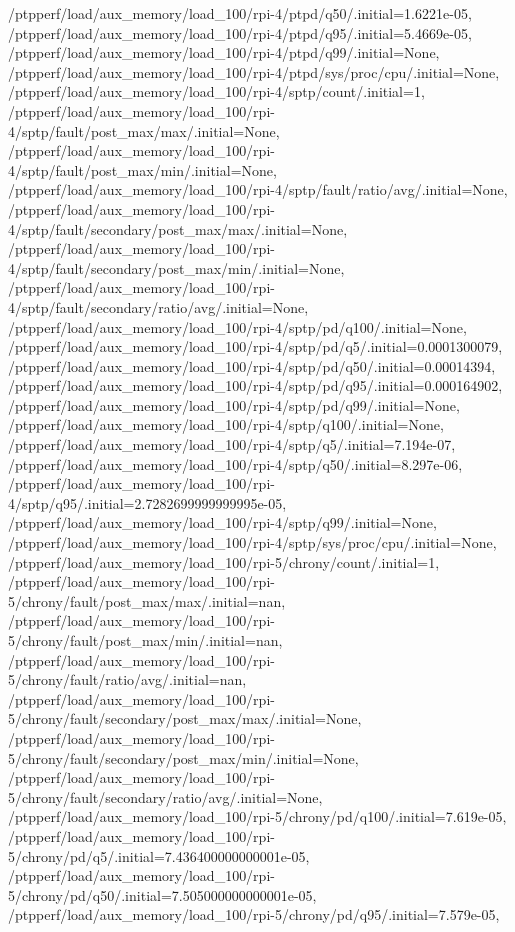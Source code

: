 {    /ptpperf/load/aux_memory/load_100/rpi-4/ptpd/q50/.initial=1.6221e-05,
    /ptpperf/load/aux_memory/load_100/rpi-4/ptpd/q95/.initial=5.4669e-05,
    /ptpperf/load/aux_memory/load_100/rpi-4/ptpd/q99/.initial=None,
    /ptpperf/load/aux_memory/load_100/rpi-4/ptpd/sys/proc/cpu/.initial=None,
    /ptpperf/load/aux_memory/load_100/rpi-4/sptp/count/.initial=1,
    /ptpperf/load/aux_memory/load_100/rpi-4/sptp/fault/post_max/max/.initial=None,
    /ptpperf/load/aux_memory/load_100/rpi-4/sptp/fault/post_max/min/.initial=None,
    /ptpperf/load/aux_memory/load_100/rpi-4/sptp/fault/ratio/avg/.initial=None,
    /ptpperf/load/aux_memory/load_100/rpi-4/sptp/fault/secondary/post_max/max/.initial=None,
    /ptpperf/load/aux_memory/load_100/rpi-4/sptp/fault/secondary/post_max/min/.initial=None,
    /ptpperf/load/aux_memory/load_100/rpi-4/sptp/fault/secondary/ratio/avg/.initial=None,
    /ptpperf/load/aux_memory/load_100/rpi-4/sptp/pd/q100/.initial=None,
    /ptpperf/load/aux_memory/load_100/rpi-4/sptp/pd/q5/.initial=0.0001300079,
    /ptpperf/load/aux_memory/load_100/rpi-4/sptp/pd/q50/.initial=0.00014394,
    /ptpperf/load/aux_memory/load_100/rpi-4/sptp/pd/q95/.initial=0.000164902,
    /ptpperf/load/aux_memory/load_100/rpi-4/sptp/pd/q99/.initial=None,
    /ptpperf/load/aux_memory/load_100/rpi-4/sptp/q100/.initial=None,
    /ptpperf/load/aux_memory/load_100/rpi-4/sptp/q5/.initial=7.194e-07,
    /ptpperf/load/aux_memory/load_100/rpi-4/sptp/q50/.initial=8.297e-06,
    /ptpperf/load/aux_memory/load_100/rpi-4/sptp/q95/.initial=2.7282699999999995e-05,
    /ptpperf/load/aux_memory/load_100/rpi-4/sptp/q99/.initial=None,
    /ptpperf/load/aux_memory/load_100/rpi-4/sptp/sys/proc/cpu/.initial=None,
    /ptpperf/load/aux_memory/load_100/rpi-5/chrony/count/.initial=1,
    /ptpperf/load/aux_memory/load_100/rpi-5/chrony/fault/post_max/max/.initial=nan,
    /ptpperf/load/aux_memory/load_100/rpi-5/chrony/fault/post_max/min/.initial=nan,
    /ptpperf/load/aux_memory/load_100/rpi-5/chrony/fault/ratio/avg/.initial=nan,
    /ptpperf/load/aux_memory/load_100/rpi-5/chrony/fault/secondary/post_max/max/.initial=None,
    /ptpperf/load/aux_memory/load_100/rpi-5/chrony/fault/secondary/post_max/min/.initial=None,
    /ptpperf/load/aux_memory/load_100/rpi-5/chrony/fault/secondary/ratio/avg/.initial=None,
    /ptpperf/load/aux_memory/load_100/rpi-5/chrony/pd/q100/.initial=7.619e-05,
    /ptpperf/load/aux_memory/load_100/rpi-5/chrony/pd/q5/.initial=7.436400000000001e-05,
    /ptpperf/load/aux_memory/load_100/rpi-5/chrony/pd/q50/.initial=7.505000000000001e-05,
    /ptpperf/load/aux_memory/load_100/rpi-5/chrony/pd/q95/.initial=7.579e-05,
}

